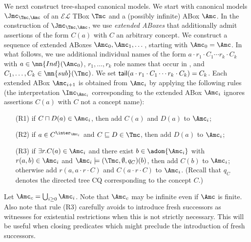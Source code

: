 \documentclass{lmcs}
\theoremstyle{definition}
\begin{document}
We next construct tree-shaped canonical models. We start with
canonical models $\Jmc_{\Tmc,\Amc}$ of an $\mathcal{EL}$ TBox $\Tmc$
and a (possibly infinite) ABox $\Amc$.
%
In the construction of $\Jmc_{\Tmc,\Amc}$, we use \emph{extended
  ABoxes} that additionally admit assertions of the form $C(a)$ with
$C$ an arbitrary \EL concept. We construct a sequence of extended ABoxes
$\Amc_0,\Amc_1,\dots$, starting with $\Amc_0 = \Amc$.  In what
follows, we use additional individual names of the form
$a \cdot r_1\cdot C_1 \cdots r_k\cdot C_k$ with
$a \in \mn{Ind}(\Amc_0)$, $r_1,\dots,r_k$ role names that occur in
\Tmc, and $C_1,\dots,C_k \in \mn{sub}(\Tmc)$. We set
${\sf tail}(a \cdot r_1\cdot C_1 \cdots r_k\cdot C_k)=C_{k}$. Each
extended ABox $\Amc_{i+1}$ is obtained from $\Amc_i$ by applying the
following rules (the interpretation $\Imc_{\Amc_{i}}$ corresponding to
the extended ABox $\Amc_{i}$ ignores assertions $C(a)$ with $C$ not a concept name):
\begin{itemize}

 
\item[(R1)] if $C \sqcap D(a) \in \Amc_i$, then add $C(a)$ and
  $D(a)$ to $\Amc_{i}$;

\item[(R2)] if %
$a \in C^{\inter_{\Amc_{i}}}$ 
and $C \sqsubseteq D \in
  \Tmc$, then add $D(a)$ to $\Amc_{i}$;

\item[(R3)] if $\exists r.C(a)\in \Amc_{i}$ and there exist $b \in
  \adom{\Amc_{i}}$ with $r(a,b)\in \Amc_{i}$ and $\Amc_{i}\models 
  (\Tmc,\emptyset,q_{C})(b)$, then add $C(b)$ to $\Amc_{i}$; otherwise add $r(a,a \cdot r\cdot C)$ and $C(a\cdot 
  r\cdot C)$ to $\Amc_{i}$. (Recall that $q_{C}$ denotes the directed tree CQ corresponding to the concept $C$.)
\end{itemize}
Let $\Amc_c = \bigcup_{i \geq 0} \Amc_i$. Note that $\Amc_c$ may be
infinite even if $\Amc$ is finite. Also note that rule (R3) carefully 
avoids to introduce fresh successors as witnesses for existential
restrictions when this is not strictly necessary. This will be useful
when closing predicates which might preclude the introduction of
fresh successors. 
\end{document}
